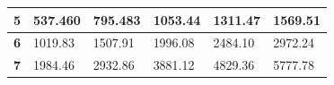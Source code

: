 \begin{table}[H]
\begin{tabular}{|c|l|l|l|l|l|}
\textbf{5}                                                      & 537.460                              & 795.483                               & 1053.44                               & 1311.47                               & 1569.51                               \\ \hline
\textbf{6}                                                                   & 1019.83                              & 1507.91                               & 1996.08                               & 2484.10                               & 2972.24                               \\ \hline
\textbf{7}                                                                   & 1984.46                              & 2932.86                               & 3881.12                               & 4829.36                               & 5777.78                               \\ \hline
\end{tabular}
\end{table}


